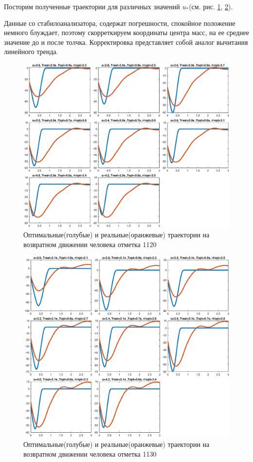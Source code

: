 \documentclass[a4paper,12pt, openany]{book}
\theoremstyle{plain} %
\theoremstyle{definition} %
\theoremstyle{remark} %
\numberwithin{equation}{chapter}
\begin{document}
{Посторим полученные траектории для различных значений $u_\ast$(см. рис. \ref{final_graphs}, \ref{final_graphs_1}).

Данные со стабилоанализатора, содержат погрешности, спокойное
положение немного блуждает, поэтому скорреткируем координаты
центра масс, на ее среднее значение до и после толчка. Корректировка представляет собой аналог
 вычитания линейного тренда.
\begin{figure}[h!]
    \centering
    \includegraphics[width=1\linewidth]{final_graphs.eps}
    \caption{Оптимальные(голубые) и реальные(оранжевые) траектории на возвратном движении человека отметка 1120}
    \label{final_graphs}
\end{figure}

\begin{figure}[h!]
    \centering
    \includegraphics[width=1\linewidth]{final_graphs_1.eps}
    \caption{Оптимальные(голубые) и реальные(оранжевые) траектории на возвратном движении человека отметка 1130}
    \label{final_graphs_1}
\end{figure}

}
\end{document}
